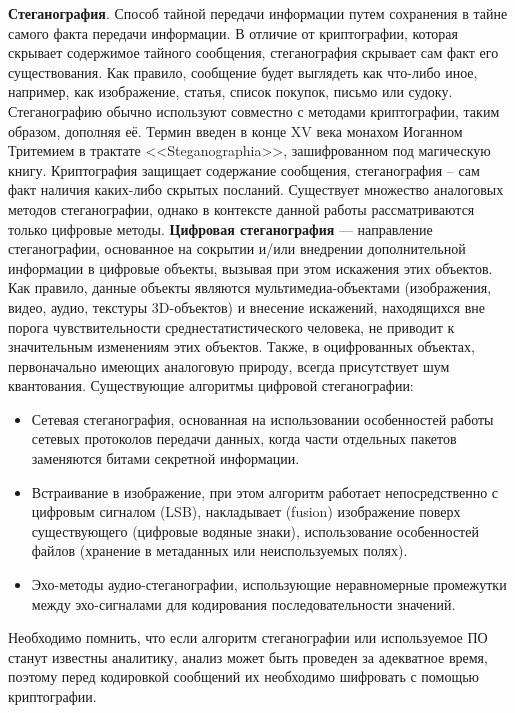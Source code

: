 \textbf{Стеганография}. Способ тайной передачи информации путем сохранения в тайне самого факта передачи информации. В отличие от криптографии, которая скрывает содержимое тайного сообщения, стеганография скрывает сам факт его существования. Как правило, сообщение будет выглядеть как что-либо иное, например, как изображение, статья, список покупок, письмо или судоку. Стеганографию обычно используют совместно с методами криптографии, таким образом, дополняя её. Термин введен  в конце XV века монахом Иоганном Тритемием в трактате <<Steganographia>>, зашифрованном под магическую книгу. Криптография защищает содержание сообщения,  стеганография --  сам факт наличия каких-либо скрытых посланий.  Существует множество аналоговых методов стеганографии, однако в контексте данной работы рассматриваются только цифровые методы.  \textbf{Цифровая стеганография} — направление  стеганографии, основанное на сокрытии и/или внедрении дополнительной информации в цифровые объекты, вызывая при этом   искажения этих объектов. Как правило, данные объекты являются мультимедиа-объектами (изображения, видео, аудио, текстуры 3D-объектов) и внесение искажений, находящихся вне порога чувствительности среднестатистического человека, не приводит к значительным изменениям этих объектов. Также, в оцифрованных объектах, первоначально имеющих аналоговую природу, всегда присутствует шум квантования. Существующие алгоритмы цифровой стеганографии:
\begin{itemize}
	\item Сетевая стеганография, основанная на использовании особенностей работы сетевых протоколов передачи данных, когда части отдельных пакетов заменяются битами секретной информации. %
	\item Встраивание в изображение, при этом алгоритм работает непосредственно с цифровым сигналом (LSB), накладывает (fusion) изображение поверх существующего (цифровые водяные знаки), использование особенностей файлов (хранение в метаданных или неиспользуемых полях).
	\item Эхо-методы аудио-стеганографии, использующие неравномерные промежутки между эхо-сигналами для кодирования последовательности значений. 
\end{itemize}
Необходимо помнить, что если алгоритм  стеганографии или используемое ПО станут известны аналитику, анализ может быть проведен за адекватное время, поэтому перед кодировкой сообщений их необходимо шифровать с помощью криптографии. %


